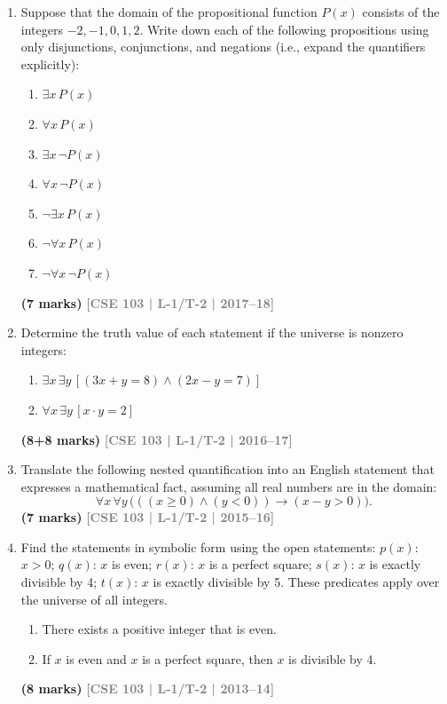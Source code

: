 \documentclass[12pt,a3paper]{article}
\newcommand{\yr}[1]{\hfill\textcolor{gray}{\small\textbf{[#1]}}}
\newcommand{\mk}[1]{\textcolor{orange!70!black}{\small\textbf{(#1 marks)}}}
\begin{document}
\begin{enumerate}
\item Suppose that the domain of the propositional function $P(x)$ consists of the integers $-2, -1, 0, 1, 2$. Write down each of the following propositions using only disjunctions, conjunctions, and negations (i.e., expand the quantifiers explicitly):
\begin{enumerate}
  \item $\exists x\, P(x)$
  \item $\forall x\, P(x)$
  \item $\exists x\, \lnot P(x)$
  \item $\forall x\, \lnot P(x)$
  \item $\lnot \exists x\, P(x)$
  \item $\lnot \forall x\, P(x)$
  \item $\lnot \forall x\, \lnot P(x)$
\end{enumerate}
\mk{7} \yr{CSE 103 | L-1/T-2 | 2017--18}  


\item Determine the truth value of each statement if the universe is nonzero integers:
\begin{enumerate}
  \item $\exists x\, \exists y\, [(3x + y = 8) \land (2x - y = 7)]$
  \item $\forall x\, \exists y\, [x \cdot y = 2]$
\end{enumerate}
\mk{8+8} \yr{CSE 103 | L-1/T-2 | 2016--17}

\item Translate the following nested quantification into an English statement that expresses a mathematical fact, assuming all real numbers are in the domain:
\[
  \forall x\, \forall y\, \bigl(((x \geq 0) \land (y < 0)) \to (x - y > 0)\bigr).
\]
\mk{7} \yr{CSE 103 | L-1/T-2 | 2015--16}

\item Find the statements in symbolic form using the open statements: $p(x)$: $x > 0$; $q(x)$: $x$ is even; $r(x)$: $x$ is a perfect square; $s(x)$: $x$ is exactly divisible by 4; $t(x)$: $x$ is exactly divisible by 5. These predicates apply over the universe of all integers.
\begin{enumerate}
  \item There exists a positive integer that is even.
  \item If $x$ is even and $x$ is a perfect square, then $x$ is divisible by 4.
\end{enumerate}
\mk{8} \yr{CSE 103 | L-1/T-2 | 2013--14}


\end{enumerate}
\end{document}
